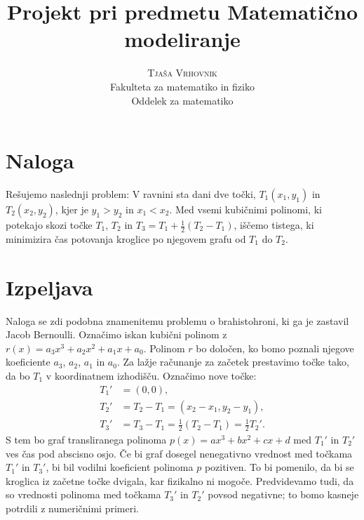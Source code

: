 \documentclass[a4paper]{article}
\begin{document}
\title{\Huge\textbf{Projekt pri predmetu Matematično modeliranje}} 
\author{\large\textsc{Tjaša Vrhovnik}\\
	Fakulteta za matematiko in fiziko\\
	Oddelek za matematiko}

\thispagestyle{empty}

\maketitle

\newpage

\tableofcontents

\newpage


\section{Naloga}

Rešujemo naslednji problem: V ravnini sta dani dve točki, $T_{1}(x_1,y_1)$ in $T_{2}(x_2,y_2)$, kjer je $y_1 > y_2$ in $x_1 < x_2$. Med vsemi kubičnimi polinomi, ki potekajo skozi točke $T_1$, $T_2$ in $T_3 = T_1 + \frac{1}{2} (T_2-T_1)$, iščemo tistega, ki minimizira čas potovanja kroglice po njegovem grafu od $T_1$ do $T_2$.

\section{Izpeljava}

Naloga se zdi podobna znamenitemu problemu o brahistohroni, ki ga je zastavil Jacob Bernoulli.
Označimo iskan kubični polinom z $r(x) = a_{3}x^3+a_{2}x^2+a_{1}x+a_{0}$. Polinom $r$ bo določen, ko bomo poznali njegove koeficiente $a_{3}$, $a_{2}$, $a_{1}$ in $a_{0}$.
Za lažje računanje za začetek prestavimo točke tako, da bo $T_1$ v koordinatnem izhodišču. Označimo nove točke:
\begin{align*}
T_{1}' &= (0,0), \\
T_{2}' &= T_2 - T_1 = (x_2-x_1, y_2-y_1), \\
T_{3}' &= T_3 - T_1 = \frac{1}{2}(T_2 - T_1) = \frac{1}{2}T_{2}'.
\end{align*}
S tem bo graf transliranega polinoma $p(x) = ax^3+bx^2+cx+d$ med $T_{1}'$ in $T_{2}'$ ves čas pod abscisno osjo. Če bi graf dosegel nenegativno vrednost med točkama $T_{1}'$ in $T_{3}'$, bi bil vodilni koeficient polinoma $p$ pozitiven. To bi pomenilo, da bi se kroglica iz začetne točke dvigala, kar fizikalno ni mogoče. Predvidevamo tudi, da so vrednosti polinoma med točkama $T_{3}'$ in $T_{2}'$ povsod negativne; to bomo kasneje potrdili z numeričnimi primeri.
\end{document}
